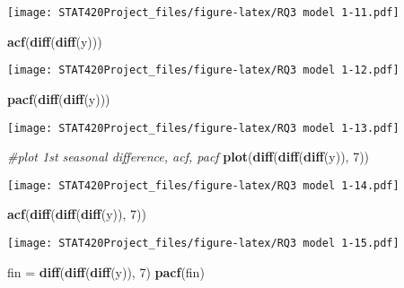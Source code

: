 \documentclass[]{article}
\newenvironment{Shaded}{\begin{snugshade}}{\end{snugshade}}
\newcommand{\CommentTok}[1]{\textcolor[rgb]{0.56,0.35,0.01}{\textit{#1}}}
\newcommand{\DecValTok}[1]{\textcolor[rgb]{0.00,0.00,0.81}{#1}}
\newcommand{\KeywordTok}[1]{\textcolor[rgb]{0.13,0.29,0.53}{\textbf{#1}}}
\newcommand{\NormalTok}[1]{#1}
\newcommand{\StringTok}[1]{\textcolor[rgb]{0.31,0.60,0.02}{#1}}
\begin{document}
\texttt{[image: STAT420Project\_files/figure-latex/RQ3 model 1-11.pdf]}

\begin{Shaded}
\begin{Highlighting}[]
\KeywordTok{acf}\NormalTok{(}\KeywordTok{diff}\NormalTok{(}\KeywordTok{diff}\NormalTok{(y)))}
\end{Highlighting}
\end{Shaded}

\texttt{[image: STAT420Project\_files/figure-latex/RQ3 model 1-12.pdf]}

\begin{Shaded}
\begin{Highlighting}[]
\KeywordTok{pacf}\NormalTok{(}\KeywordTok{diff}\NormalTok{(}\KeywordTok{diff}\NormalTok{(y)))}
\end{Highlighting}
\end{Shaded}

\texttt{[image: STAT420Project\_files/figure-latex/RQ3 model 1-13.pdf]}

\begin{Shaded}
\begin{Highlighting}[]
\CommentTok{#plot 1st seasonal difference, acf, pacf}
\KeywordTok{plot}\NormalTok{(}\KeywordTok{diff}\NormalTok{(}\KeywordTok{diff}\NormalTok{(}\KeywordTok{diff}\NormalTok{(y)), }\DecValTok{7}\NormalTok{))}
\end{Highlighting}
\end{Shaded}

\texttt{[image: STAT420Project\_files/figure-latex/RQ3 model 1-14.pdf]}

\begin{Shaded}
\begin{Highlighting}[]
\KeywordTok{acf}\NormalTok{(}\KeywordTok{diff}\NormalTok{(}\KeywordTok{diff}\NormalTok{(}\KeywordTok{diff}\NormalTok{(y)), }\DecValTok{7}\NormalTok{))}
\end{Highlighting}
\end{Shaded}

\texttt{[image: STAT420Project\_files/figure-latex/RQ3 model 1-15.pdf]}

\begin{Shaded}
\begin{Highlighting}[]
\NormalTok{fin =}\StringTok{ }\KeywordTok{diff}\NormalTok{(}\KeywordTok{diff}\NormalTok{(}\KeywordTok{diff}\NormalTok{(y)), }\DecValTok{7}\NormalTok{)}
\KeywordTok{pacf}\NormalTok{(fin)}
\end{Highlighting}
\end{Shaded}
\end{document}
